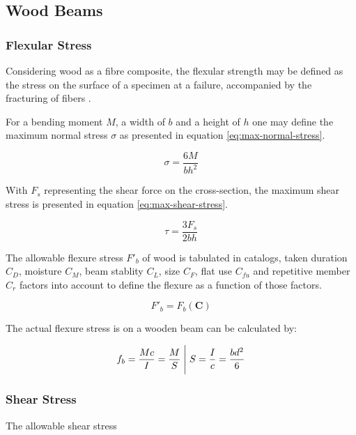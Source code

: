 \subsection{Wood Beams}

\subsubsection{Flexular Stress}

Considering wood as a fibre composite, the flexular strength may be defined as
the stress on the surface of a specimen at a failure, accompanied by the
fracturing of fibers
\cite[chapter 7.2]{hodgikinson-mech-testing-fibre-composites}.

For a bending moment $M$, a width of $b$ and a height of $h$ one may define
the maximum normal stress $\sigma$ as presented in equation
\ref{eq:max-normal-stress}.

\begin{equation}\label{eq:max-normal-stress}
\sigma = \frac{6M}{bh^2}
\end{equation}

With $F_s$ representing the shear force on the cross-section, the maximum shear
stress is presented in equation \ref{eq:max-shear-stress}.

\begin{equation}\label{eq:max-shear-stress}
\tau = \frac{3F_s}{2bh}
\end{equation}

The allowable flexure stress $F'_b$ of wood is tabulated in catalogs, taken
duration $C_D$, moisture $C_M$, beam stablity $C_L$, size $C_F$,
flat use $C_{fu}$ and repetitive member $C_r$ factors into account to define
the flexure as a function of those factors.

\begin{equation}
F'_{b} = F_b(\mathbf C)
\end{equation}

The actual flexure stress is on a wooden beam can be calculated by:

\begin{equation}
f_b = \frac{Mc}{I} = \frac{M}{S} \Biggm\lvert S = \frac{I}{c} = \frac{bd^2}{6}
\end{equation}

\subsubsection{Shear Stress}
The allowable shear stress
